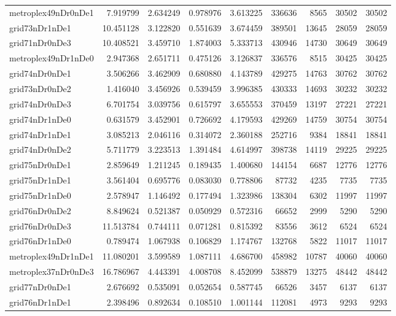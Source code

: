 \documentclass[../../../thesis.tex]{subfiles}
\begin{document}
\begin{longtable}{|l|r|r|r|r|r|r|r|r|}
metroplex49nDr0nDe1 & 7.919799 & 2.634249 & 0.978976 & 3.613225 & 336636 & 8565 & 30502 & 30502 \\
grid73nDr1nDe1 & 10.451128 & 3.122820 & 0.551639 & 3.674459 & 389501 & 13645 & 28059 & 28059 \\
grid71nDr0nDe3 & 10.408521 & 3.459710 & 1.874003 & 5.333713 & 430946 & 14730 & 30649 & 30649 \\
metroplex49nDr1nDe0 & 2.947368 & 2.651711 & 0.475126 & 3.126837 & 336576 & 8515 & 30425 & 30425 \\
grid74nDr0nDe1 & 3.506266 & 3.462909 & 0.680880 & 4.143789 & 429275 & 14763 & 30762 & 30762 \\
grid73nDr0nDe2 & 1.416040 & 3.456926 & 0.539459 & 3.996385 & 430333 & 14693 & 30232 & 30232 \\
grid74nDr0nDe3 & 6.701754 & 3.039756 & 0.615797 & 3.655553 & 370459 & 13197 & 27221 & 27221 \\
grid74nDr1nDe0 & 0.631579 & 3.452901 & 0.726692 & 4.179593 & 429269 & 14759 & 30754 & 30754 \\
grid74nDr1nDe1 & 3.085213 & 2.046116 & 0.314072 & 2.360188 & 252716 & 9384 & 18841 & 18841 \\
grid74nDr0nDe2 & 5.711779 & 3.223513 & 1.391484 & 4.614997 & 398738 & 14119 & 29225 & 29225 \\
grid75nDr0nDe1 & 2.859649 & 1.211245 & 0.189435 & 1.400680 & 144154 & 6687 & 12776 & 12776 \\
grid75nDr1nDe1 & 3.561404 & 0.695776 & 0.083030 & 0.778806 & 87732 & 4235 & 7735 & 7735 \\
grid75nDr1nDe0 & 2.578947 & 1.146492 & 0.177494 & 1.323986 & 138304 & 6302 & 11997 & 11997 \\
grid76nDr0nDe2 & 8.849624 & 0.521387 & 0.050929 & 0.572316 & 66652 & 2999 & 5290 & 5290 \\
grid76nDr0nDe3 & 11.513784 & 0.744111 & 0.071281 & 0.815392 & 83556 & 3612 & 6524 & 6524 \\
grid76nDr1nDe0 & 0.789474 & 1.067938 & 0.106829 & 1.174767 & 132768 & 5822 & 11017 & 11017 \\
metroplex49nDr1nDe1 & 11.080201 & 3.599589 & 1.087111 & 4.686700 & 458982 & 10787 & 40060 & 40060 \\
metroplex37nDr0nDe3 & 16.786967 & 4.443391 & 4.008708 & 8.452099 & 538879 & 13275 & 48442 & 48442 \\
grid77nDr0nDe1 & 2.676692 & 0.535091 & 0.052654 & 0.587745 & 66526 & 3457 & 6137 & 6137 \\
grid76nDr1nDe1 & 2.398496 & 0.892634 & 0.108510 & 1.001144 & 112081 & 4973 & 9293 & 9293 \\

\end{longtable}
\end{document}
